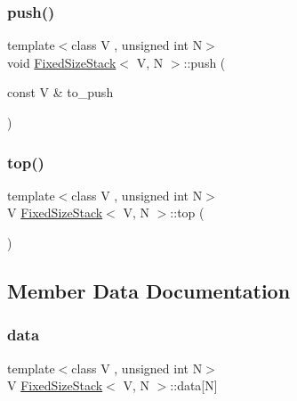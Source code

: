 \mbox{\label{classFixedSizeStack_abaa79c280f2ff9adb3ae919a0a8607fb}} 
\subsubsection{\texorpdfstring{push()}{push()}}
{\footnotesize\ttfamily template$<$class V , unsigned int N$>$ \\
void \mbox{\hyperlink{classFixedSizeStack}{Fixed\+Size\+Stack}}$<$ V, N $>$\+::push (\begin{DoxyParamCaption}\item[{const V \&}]{to\+\_\+push }\end{DoxyParamCaption})\hspace{0.3cm}{\ttfamily [inline]}}

\mbox{\label{classFixedSizeStack_a155565554dcbfade8363d3d6035613c5}} 
\subsubsection{\texorpdfstring{top()}{top()}}
{\footnotesize\ttfamily template$<$class V , unsigned int N$>$ \\
V \mbox{\hyperlink{classFixedSizeStack}{Fixed\+Size\+Stack}}$<$ V, N $>$\+::top (\begin{DoxyParamCaption}{ }\end{DoxyParamCaption})\hspace{0.3cm}{\ttfamily [inline]}}



\subsection{Member Data Documentation}
\mbox{\label{classFixedSizeStack_a25c7e307ab4079edafe72446c411aa74}} 
\subsubsection{\texorpdfstring{data}{data}}
{\footnotesize\ttfamily template$<$class V , unsigned int N$>$ \\
V \mbox{\hyperlink{classFixedSizeStack}{Fixed\+Size\+Stack}}$<$ V, N $>$\+::data\mbox{[}N\mbox{]}\hspace{0.3cm}{\ttfamily [private]}}

